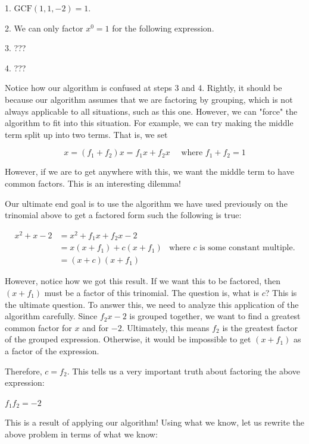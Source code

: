 1.  $\text{GCF}(1,1,-2)=1$.

2.  We can only factor $x^{0}=1$ for the following expression.

3.  ???

4.  ???



Notice how our algorithm is confused at steps 3 and 4. Rightly, it should be because our
algorithm assumes that we are factoring by grouping, which is not always applicable to all
situations, such as this one. However, we can "force" the algorithm to fit into this
situation. For example, we can try making the middle term split up into two terms. That
is, we set

$$x=(f _{1}+f _{2})x=f _{1}x+f _{2}x \quad \text{ where } f _{1}+f _{2}=1$$



However, if we are to get anywhere with this, we want the middle term to have common
factors. This is an interesting dilemma!



Our ultimate end goal is to use the algorithm we have used previously on the trinomial
above to get a factored form such the following is true:



\begin{align} x^{2}+x-2&=x^{2}+f _{1}x+f _{2}x-2 \\ & =x(x+f _{1})+c(x+f _{1}) & \text{where }c\text{ is some constant multiple.} \\ & =(x+c)(x+f _{1}) \end{align}



However, notice how we got this result. If we want this to be factored, then $(x+f _{1})$
must be a factor of this trinomial. The question is, what is $c$? This is the ultimate
question. To answer this, we need to analyze this application of the algorithm carefully.
Since $f _{2}x-2$ is grouped together, we want to find a greatest common factor for $x$
and for $-2$. Ultimately, this means $f _{2}$ is the greatest factor of the grouped
expression. Otherwise, it would be impossible to get $(x+f _{1})$ as a factor of the
expression.



Therefore, $c=f _{2}$. This tells us a very important truth about factoring the above expression:

$f _{1}f _{2}=-2$



This is a result of applying our algorithm! Using what we know, let us rewrite the above
problem in terms of what we know:

